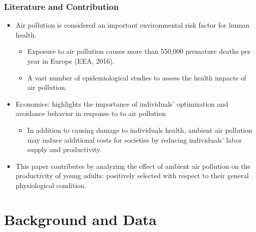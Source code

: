 \documentclass[dvipdfmx,11pt]{beamer}
\begin{document}
\begin{frame}\frametitle{Literature and Contribution}
  \begin{itemize}
    \item Air pollution is considered an important environmental risk factor for human health.
    \begin{itemize}
      \item Exposure to air pollution causes more than 550,000 premature deaths per year in Europe (EEA, 2016).
      \item A vast number of epidemiological studies to assess the health impacts of air pollution.
    \end{itemize}
    \item Economics: highlights the importance of individuals' optimization and avoidance behavior in response to to air pollution
    \begin{itemize}
      \item In addition to causing damage to individuals health, ambient air pollution may induce additional costs for societies by reducing individuals' labor supply and productivity.
    \end{itemize}
    \item This paper contributes by analyzing the effect of ambient air pollution on the productivity of young adults: positively selected with respect to their general physiological condition.
  \end{itemize}
\end{frame}

\section{Background and Data}
\end{document}

